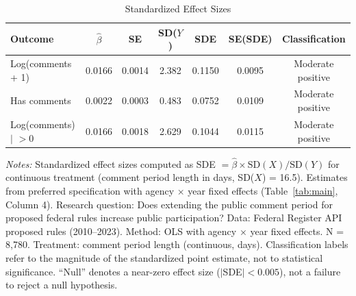 \begin{table}[t]
\centering
\caption{Standardized Effect Sizes}
\label{tab:sde}
\begin{threeparttable}
\begin{tabular}{lcccccc}
\toprule
Outcome & $\hat{\beta}$ & SE & SD($Y$) & SDE & SE(SDE) & Classification \\
\midrule
Log(comments + 1) & 0.0166 & 0.0014 & 2.382 & 0.1150 & 0.0095 & Moderate positive \\
Has comments & 0.0022 & 0.0003 & 0.483 & 0.0752 & 0.0109 & Moderate positive \\
Log(comments) $|$ $>0$ & 0.0166 & 0.0018 & 2.629 & 0.1044 & 0.0115 & Moderate positive \\
\bottomrule
\end{tabular}
\begin{tablenotes}
\small
\item \textit{Notes:} Standardized effect sizes computed as SDE $= \hat{\beta} \times \text{SD}(X) / \text{SD}(Y)$ for continuous treatment (comment period length in days, SD($X$) = 16.5). Estimates from preferred specification with agency $\times$ year fixed effects (Table~\ref{tab:main}, Column 4). Research question: Does extending the public comment period for proposed federal rules increase public participation? Data: Federal Register API proposed rules (2010--2023). Method: OLS with agency $\times$ year fixed effects. N = 8,780. Treatment: comment period length (continuous, days). Classification labels refer to the magnitude of the standardized point estimate, not to statistical significance. ``Null'' denotes a near-zero effect size ($|$SDE$| < 0.005$), not a failure to reject a null hypothesis.
\end{tablenotes}
\end{threeparttable}
\end{table}

